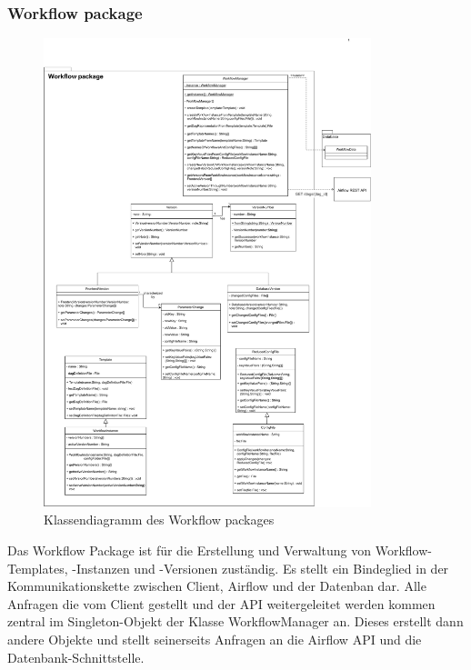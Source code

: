 \subsubsection{Workflow package}
\begin{figure}[h!]
    \includegraphics[width=0.85\textwidth]{res/Klassen/wfPackage.pdf}
    \caption{Klassendiagramm des Workflow packages}
\end{figure}
\FloatBarrier
Das Workflow Package ist für die Erstellung und Verwaltung von Workflow-Templates, -Instanzen und -Versionen zuständig.
Es stellt ein Bindeglied in der Kommunikationskette zwischen Client, Airflow und der Datenban dar.
Alle Anfragen die vom Client gestellt und der API weitergeleitet werden kommen zentral im Singleton-Objekt der Klasse WorkflowManager an.
Dieses erstellt dann andere Objekte und stellt seinerseits Anfragen an die Airflow API und die Datenbank-Schnittstelle.

\FloatBarrier
\newpage

